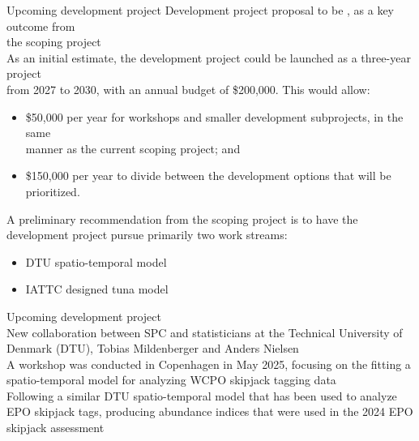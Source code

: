 \documentclass[aspectratio=169,fleqn]{beamer}
\begin{document}
\begin{frame}{Upcoming development project}\small
  Development project proposal to be , as a
  key outcome from\\
  the scoping project\\[2ex]
  As an initial estimate, the development project could be launched as a
  three-year project\\
  from 2027 to 2030, with an annual budget of \$200,000. This would
  allow:\\[0.5ex]
  \begin{itemize}
    \item[] \$50,000 per year for workshops and smaller development subprojects,
    in the same\\
    manner as the current scoping project; and\\[1.5ex]
    \item[] \$150,000 per year to divide between the development options that
    will be prioritized.\\[3ex]
  \end{itemize}
  A preliminary recommendation from the scoping project is to have the
  development project pursue primarily two work streams:\\[0.5ex]
  \begin{itemize}
    \item DTU spatio-temporal model
    \item IATTC designed tuna model\\[1ex]
  \end{itemize}
\end{frame}


\begin{frame}{Upcoming development project}\small
  \\[2ex]
  New collaboration between SPC and statisticians at the Technical University of
  Denmark (DTU), Tobias Mildenberger and Anders Nielsen\\[2.5ex]
  A workshop was conducted in Copenhagen in May 2025, focusing on the fitting a
  spatio-temporal model for analyzing WCPO skipjack tagging data\\[2.5ex]
  Following a similar DTU spatio-temporal model that has been used to analyze
  EPO skipjack tags, producing abundance indices that were used in the 2024
  EPO skipjack assessment\\[18ex]
\end{frame}
\end{document}

